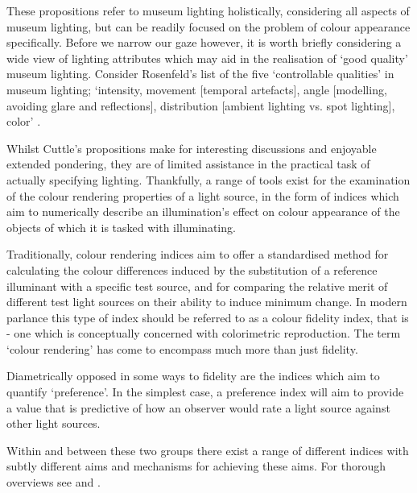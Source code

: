These propositions refer to museum lighting holistically, considering all aspects of museum lighting, but can be readily focused on the problem of colour appearance specifically. Before we narrow our gaze however, it is worth briefly considering a wide view of lighting attributes which may aid in the realisation of `good quality' museum lighting. Consider Rosenfeld's list of the five `controllable qualities' in museum lighting; `intensity, movement [temporal artefacts], angle [modelling, avoiding glare and reflections], distribution [ambient lighting vs. spot lighting], color' \citep{rosenfeld_agony_2013}.

Whilst Cuttle's propositions make for interesting discussions and enjoyable extended pondering, they are of limited assistance in the practical task of actually specifying lighting. Thankfully, a range of tools exist for the examination of the colour rendering properties of a light source, in the form of indices which aim to numerically describe an illumination's effect on colour appearance of the objects of which it is tasked with illuminating.

Traditionally, colour rendering indices aim to offer a standardised method for calculating the colour differences induced by the substitution of a reference illuminant with a specific test source, and for comparing the relative merit of different test light sources on their ability to induce minimum change. In modern parlance this type of index should be referred to as a colour fidelity index, that is - one which is conceptually concerned with colorimetric reproduction. The term `colour rendering' has come to encompass much more than just fidelity.

Diametrically opposed in some ways to fidelity are the indices which aim to quantify `preference'. In the simplest case, a preference index will aim to provide a value that is predictive of how an observer would rate a light source against other light sources. 

Within and between these two groups there exist a range of different indices with subtly different aims and mechanisms for achieving these aims. For thorough overviews see \citet{guo_review_2004} and \citet{houser_review_2013}.

